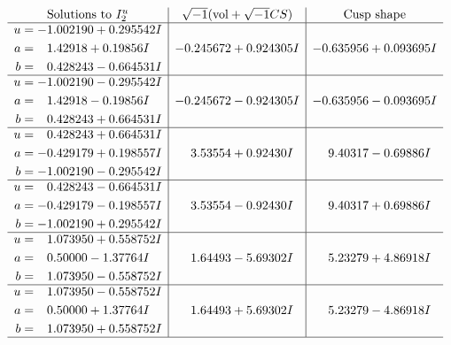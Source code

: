 \documentclass[1p]{elsarticle_modified}
\theoremstyle{definition}
\newcommand{\I}{\sqrt{-1}}
\begin{document}
$$\begin{array}{c|c|c}  
\text{Solutions to }I^u_{2}& \I (\text{vol} + \sqrt{-1}CS) & \text{Cusp shape}\\
 \hline 
\begin{aligned}
u &= -1.002190 + 0.295542 I \\
a &= \phantom{-}1.42918 + 0.19856 I \\
b &= \phantom{-}0.428243 - 0.664531 I\end{aligned}
 & -0.245672 + 0.924305 I & -0.635956 + 0.093695 I \\ \hline\begin{aligned}
u &= -1.002190 - 0.295542 I \\
a &= \phantom{-}1.42918 - 0.19856 I \\
b &= \phantom{-}0.428243 + 0.664531 I\end{aligned}
 & -0.245672 - 0.924305 I & -0.635956 - 0.093695 I \\ \hline\begin{aligned}
u &= \phantom{-}0.428243 + 0.664531 I \\
a &= -0.429179 + 0.198557 I \\
b &= -1.002190 - 0.295542 I\end{aligned}
 & \phantom{-}3.53554 + 0.92430 I & \phantom{-}9.40317 - 0.69886 I \\ \hline\begin{aligned}
u &= \phantom{-}0.428243 - 0.664531 I \\
a &= -0.429179 - 0.198557 I \\
b &= -1.002190 + 0.295542 I\end{aligned}
 & \phantom{-}3.53554 - 0.92430 I & \phantom{-}9.40317 + 0.69886 I \\ \hline\begin{aligned}
u &= \phantom{-}1.073950 + 0.558752 I \\
a &= \phantom{-}0.50000 - 1.37764 I \\
b &= \phantom{-}1.073950 - 0.558752 I\end{aligned}
 & \phantom{-}1.64493 - 5.69302 I & \phantom{-}5.23279 + 4.86918 I \\ \hline\begin{aligned}
u &= \phantom{-}1.073950 - 0.558752 I \\
a &= \phantom{-}0.50000 + 1.37764 I \\
b &= \phantom{-}1.073950 + 0.558752 I\end{aligned}
 & \phantom{-}1.64493 + 5.69302 I & \phantom{-}5.23279 - 4.86918 I\\
 \hline 
 \end{array}$$\newpage
\end{document}

